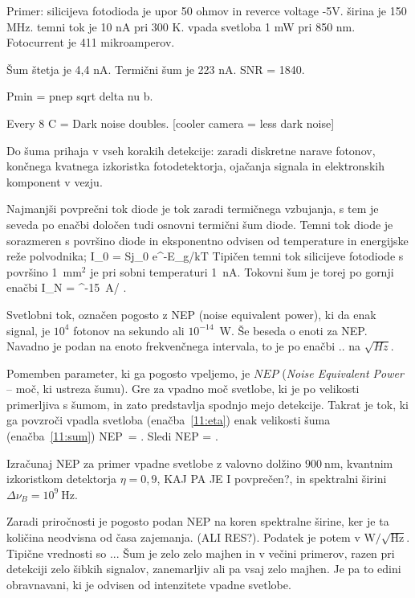 Primer: silicijeva fotodioda je upor 50 ohmov in reverce voltage -5V. širina je 150 MHz. 
temni tok je 10 nA pri 300 K. vpada svetloba 1 mW pri 850 nm. Fotocurrent je 411 mikroamperov. 

Šum štetja je 4,4 nA. Termični šum je 223 nA. SNR = 1840. 

Pmin = pnep sqrt delta nu b.

Every 8
C = Dark noise doubles.
[cooler camera = less dark noise]

Do šuma prihaja v vseh korakih detekcije: zaradi diskretne narave fotonov, končnega kvatnega 
izkoristka fotodetektorja, ojačanja signala in elektronskih komponent v vezju.

Najmanjši povprečni tok diode je tok zaradi
termičnega vzbujanja, s tem je seveda po enačbi določen tudi osnovni termični šum diode.
Temni tok diode je sorazmeren s površino diode in eksponentno odvisen od temperature in 
energijske reže polvodnika;
\beq
I_0 = Sj_0 e^{-E_g/kT}
\eeq
Tipičen temni tok silicijeve fotodiode s površino 1~mm$^2$ je pri sobni temperaturi 1~nA. 
Tokovni šum je torej po gornji enačbi
\beq
I_N =  ^{-15}~A/ \sqrt{\Delta \nu}.
\eeq

Svetlobni tok, označen pogosto z NEP (noise equivalent power), ki da enak signal, je $10^4 $
fotonov na sekundo ali $10^{-14}$~W. Še beseda o enoti za NEP. Navadno je podan na enoto 
frekvenčnega intervala, to je po enačbi .. na $\sqrt{Hz}$. 


Pomemben parameter, ki ga pogosto vpeljemo, je $NEP$ ({\it Noise Equivalent Power} -- 
moč, ki ustreza šumu). Gre za vpadno moč svetlobe, ki je po velikosti primerljiva 
s šumom, in zato predstavlja spodnjo mejo detekcije. Takrat je tok, ki ga povzroči 
vpadla svetloba (enačba~\ref{11:eta}) enak velikosti šuma (enačba~\ref{11:sum})
\beq
NEP\,  \eta = .
\eeq
Sledi
\beq
NEP = .
\eeq
\begin{definition}
Izračunaj NEP za primer vpadne svetlobe z valovno dolžino $900~\si{\nano\meter}$, kvantnim
izkoristkom detektorja $\eta = 0,9$, KAJ PA JE I povprečen?, in spektralni širini 
$\Delta \nu_B=10^9~\si{\hertz}$.
\end{definition}
Zaradi priročnosti je pogosto podan NEP na koren spektralne širine, ker je ta 
količina neodvisna od časa zajemanja. (ALI RES?). Podatek je potem v 
$\si{\watt}/\sqrt{\si{\hertz}}$. Tipične vrednosti so ...
Šum je zelo zelo majhen in v večini primerov, razen pri detekciji zelo 
šibkih signalov, zanemarljiv ali pa vsaj zelo majhen. Je pa to edini obravnavani,
ki je odvisen od intenzitete vpadne svetlobe. 

